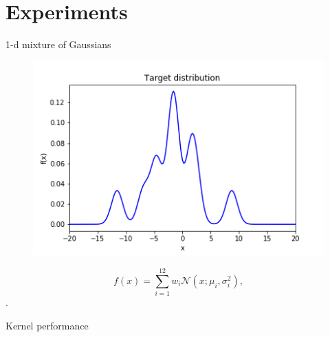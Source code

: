\documentclass{beamer}
\begin{document}
\section{Experiments}
\begin{frame}
\begin{block}{1-d mixture of Gaussians}
	\begin{figure}
		\centering
		\includegraphics[width=0.6\linewidth]{figs/targetexil1a.png}
	\end{figure}
	\begin{displaymath}
	f(x) = \sum_{i=1}^{12} w_i \mathcal{N}(x;\mu_i,\sigma^2_i),
	\end{displaymath}
	.
\end{block}
\end{frame}

\begin{frame}
\begin{block}{Kernel performance}
\begin{figure}
	\centering
	\captionsetup[subfigure]{labelformat=empty}
	

\end{figure}
\end{block}
\end{frame}
\end{document}
